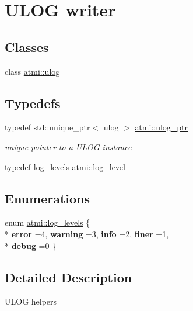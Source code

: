 \hypertarget{group__logging}{\section{U\+L\+O\+G writer}
\label{group__logging}
}
\subsection*{Classes}
\begin{DoxyCompactItemize}
\item 
class \hyperlink{classatmi_1_1ulog}{atmi\+::ulog}
\end{DoxyCompactItemize}
\subsection*{Typedefs}
\begin{DoxyCompactItemize}
\item 
\hypertarget{group__logging_gaa0869c7a6b1f7846685e2454b70b9e7a}{typedef std\+::unique\+\_\+ptr$<$ ulog $>$ \hyperlink{group__logging_gaa0869c7a6b1f7846685e2454b70b9e7a}{atmi\+::ulog\+\_\+ptr}}\label{group__logging_gaa0869c7a6b1f7846685e2454b70b9e7a}

\begin{DoxyCompactList}\small\item\em unique pointer to a U\+L\+O\+G instance \end{DoxyCompactList}\item 
typedef log\+\_\+levels \hyperlink{group__logging_ga74d2cbe55d42a8a309e5535678fd9db3}{atmi\+::log\+\_\+level}
\end{DoxyCompactItemize}
\subsection*{Enumerations}
\begin{DoxyCompactItemize}
\item 
enum \hyperlink{group__logging_gaf9bdc466e66896621125b81d022264ca}{atmi\+::log\+\_\+levels} \{ \\*
{\bfseries error} =4, 
{\bfseries warning} =3, 
{\bfseries info} =2, 
{\bfseries finer} =1, 
\\*
{\bfseries debug} =0
 \}
\end{DoxyCompactItemize}


\subsection{Detailed Description}
U\+L\+O\+G helpers 

